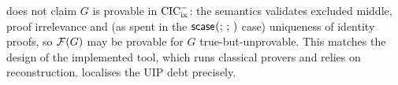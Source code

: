 \begin{remark}
\label{rem:not-claimed}
 does not claim $G$ is provable in $\mathrm{CIC}^{-}_{\mathrm{ix}}$: the
semantics validates excluded middle, proof irrelevance and (as spent in
the $\mathsf{scase}_{}(;\,;\,)$ case) uniqueness of identity proofs, so
$\mathcal{F}(G)$ may be provable for $G$ true-but-unprovable.  This matches the
design of the implemented tool, which runs classical provers and relies
on reconstruction.   localises the UIP debt
precisely.
\end{remark}
